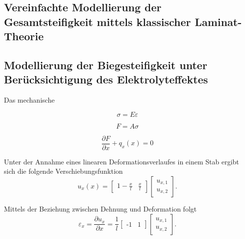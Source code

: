\subsection{Vereinfachte Modellierung der Gesamtsteifigkeit mittels klassischer Laminat-Theorie}


\subsection{Modellierung der Biegesteifigkeit unter Berücksichtigung des Elektrolyteffektes}

Das mechanische




\begin{equation}
    \sigma = E \varepsilon
\end{equation}

\begin{equation}
    F = A \sigma
\end{equation}

\begin{equation}
    \frac{\partial F}{\partial x}+ q_x(x) = 0
\end{equation}

Unter der Annahme eines linearen Deformationsverlaufes in einem Stab ergibt sich die folgende Verschiebungsfunktion 
\begin{equation}
    u_x(x) = \begin{bmatrix} 1-\frac{x}{l} & \frac{x}{l} \end{bmatrix}\begin{bmatrix} 
        u_{x,1} \\
        u_{x,2} 
    \end{bmatrix}.
\end{equation}

Mittels der Beziehung zwischen Dehnung und Deformation folgt 
\begin{equation}
    \varepsilon_x = \frac{\partial u_x}{\partial x} = 
    \frac{1}{l}
    \begin{bmatrix} 
        \text{-}1 & 1 
    \end{bmatrix}
    \begin{bmatrix} 
        u_{x,1} \\
        u_{x,2} 
    \end{bmatrix}.
\end{equation}

